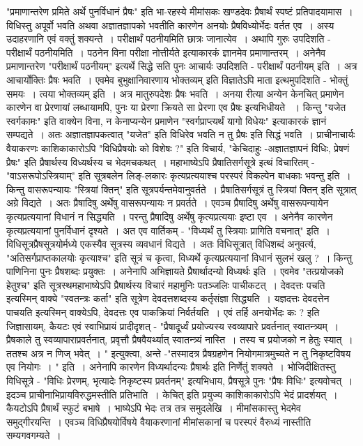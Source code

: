 {"प्रमाणान्तरेण प्रमिते अर्थे पुनर्विधानं प्रैषः" इति भा-रहस्ये मीमांसकः खण्डदेवः प्रैषार्थं स्पष्टं प्रतिपादयामास~। विधिस्तु अपूर्वो भवति अथवा अज्ञातज्ञापको भवतीति कारणेन अनयोः प्रैषविध्योर्भेदः वर्तत एव~। अस्य उदाहरणानि एवं वक्तुं शक्यन्ते~। परीक्षार्थं पठनीयमिति छात्रः जानात्येव~। अथापि गुरुः उपदिशति - परीक्षार्थं पठनीयमिति~। पठनेन विना परीक्षा नोत्तीर्यते इत्याकारकं ज्ञानमेव प्रमाणान्तरम्~। अनेनैव प्रमाणान्तरेण "परीक्षार्थं पठनीयम्" इत्यर्थे सिद्धे सति पुनः आचार्यः उपदिशति - परीक्षार्थं पठनीयम् इति~। अत्र आचार्योक्तिः प्रैषः भवति~। एवमेव बुभुक्षानिवारणाय भोक्तव्यम् इति विज्ञातेऽपि माता इत्थमुपदिशति - भोक्तुं समयः~। त्वया भोक्तव्यम् इति~। अत्र मातुरुपदेशः प्रैषः भवति~। अनया रीत्या अन्येन केनचित् प्रमाणेन कारणेन वा  प्रेरणायां लब्धायामपि, पुनः या प्रेरणा क्रियते सा प्रेरणा एव प्रैषः इत्यभिधीयते ~। किन्तु "यजेत स्वर्गकामः" इति वाक्येन विना, न केनाप्यन्येन प्रमाणेन "स्वर्गप्राप्त्यर्थं यागो विधेयः" इत्याकारकं ज्ञानं सम्पद्यते~। अतः अज्ञातज्ञापकत्वात् "यजेत" इति विधिरेव भवति न तु प्रैषः इति सिद्धं भवति~। प्राचीनाचार्यः वैयाकरणः काशिकाकारोऽपि "विधिप्रैषयोः को विशेषः ?" इति विचार्य, "केचिदाहुः -अज्ञातज्ञापनं विधिः, प्रेषणं प्रैषः" इति प्रैषार्थस्य विध्यर्थस्य च भेदमचकथत्~। महाभाष्येऽपि प्रैषातिसर्गसूत्रे इत्थं विचारितम् - "वाऽसरूपोऽस्त्रियाम्" इति सूत्रबलेन लिङ्-लकारः कृत्यप्रत्ययाश्च परस्परं विकल्पेन बाधकाः भवन्तु इति~। किन्तु वासरूपन्यायः "स्त्रियां क्तिन्" इति सूत्रपर्यन्तमेवानुवर्तते~। प्रैषातिसर्गसूत्रं तु स्त्रियां क्तिन् इति सूत्रात् अग्रे विद्यते~। अतः प्रैषादिषु अर्थेषु वासरूपन्यायः न प्रवर्तते~। एवञ्च प्रैषादिषु अर्थेषु वासरूपन्यायेन कृत्यप्रत्ययानां विधानं न सिद्ध्यति~। परन्तु प्रैषादिषु अर्थेषु कृत्यप्रत्ययाः इष्टा एव~। अनेनैव कारणेन कृत्यप्रत्ययानां पुनर्विधानं दृश्यते~। अत एव वार्तिकम् - "विध्यर्थं तु स्त्रियाः प्रागिति वचनात्" इति~। विधिसूत्रप्रैषसूत्रयोर्मध्ये एकस्यैव सूत्रस्य व्यवधानं विद्यते~। अतः विधिसूत्रात् विधिशब्दं अनुवर्त्य, "अतिसर्गप्राप्तकालयोः कृत्याश्च" इति सूत्रं च कृत्वा, विध्यर्थे कृत्यप्रत्ययानां विधानं सुलभं खलु ?~। किन्तु पाणिनिना पुनः प्रैषशब्दः प्रयुक्तः~। अनेनापि अभिज्ञायते प्रैषार्थादन्यो विध्यर्थः इति~। एवमेव "तत्प्रयोजको हेतुश्च" इति सूत्रस्थमहाभाष्येऽपि प्रैषार्थस्य विचारं महामुनिः पतञ्जलिः पाचीकटत्~।  देवदत्तः पचति इत्यस्मिन् वाक्ये "स्वतन्त्रः कर्ता" इति सूत्रेण देवदत्तशब्दस्य कर्तृसंज्ञा सिद्ध्यति~। यज्ञदत्तः देवदत्तेन पाचयति इत्यस्मिन् वाक्येऽपि, देवदत्तः एव पाकक्रियां निर्वर्तयति~। एवं तर्हि अनयोर्भेदः कः ? इति जिज्ञासायम्, कैयटः एवं स्वाभिप्रायं प्रादीदृशत्  - "प्रैषादूर्ध्वं प्रयोज्यस्य स्वव्यापारे प्रवर्तनात् स्वातन्त्र्यम्~। प्रैषकाले तु स्वव्यापाराप्रवर्तनात्, प्रवृत्तौ प्रैषवैयर्थ्यात् स्वातन्त्र्यं नास्ति~। तस्य च  प्रयोजको न हेतुः स्यात्~। ततश्च अत्र न णिज् भवेत्~। " इत्युक्त्वा, अन्ते -"तस्मादत्र प्रैषग्रहणेन नियोगमात्रमुच्यते न तु निकृष्टविषय एव नियोगः~। " इति~। अनेनापि कारणेन विध्यर्थादन्यः प्रैषार्थः इति निर्णेतुं शक्यते~। भोजिदीक्षितस्तु विधिसूत्रे - "विधिः प्रेरणम्, भृत्यादेः निकृष्टस्य प्रवर्तनम्" इत्यभिधाय, प्रैषसूत्रे पुनः "प्रैषः विधिः" इत्यवोचत्~। इदञ्च प्राचीनाभिप्रायविरुद्धमस्तीति प्रतिभाति~। केचित् इति प्रयुज्य काशिकाकारोऽपि भेदं प्रादर्शयत्~। कैयटोऽपि प्रैषार्थं स्फुटं बभाषे~। भाष्येऽपि भेदः तत्र तत्र समुदलेखि~। मीमांसकास्तु भेदमेव समुद्गीरयन्ति~। एवञ्च विधिप्रैषयोर्विषये  वैयाकरणानां मीमांसकानां च परस्परं वैरुध्यं नास्तीति सम्यगवगम्यते~। 

}
